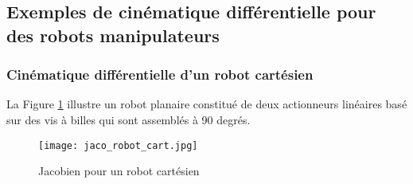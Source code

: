 \newpage
\subsection{Exemples de cinématique différentielle pour des robots manipulateurs}

\subsubsection{Cinématique différentielle d'un robot cartésien}

La Figure \ref{fig:jaco_robot_cart} illustre un robot planaire constitué de deux actionneurs linéaires basé sur des vis à billes qui sont assemblés à 90 degrés.
\begin{figure}[H]
	\vspace{-5pt}
	\centering
	\texttt{[image: jaco\_robot\_cart.jpg]}
	\caption{Jacobien pour un robot cartésien}
	\vspace{-5pt}
	\label{fig:jaco_robot_cart}
\end{figure}

